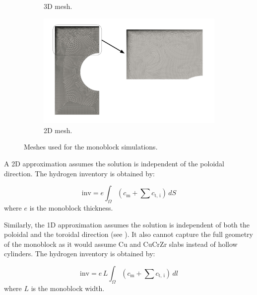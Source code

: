 \begin{figure}
\begin{subfigure}{0.27\linewidth}
        \caption{3D mesh.}
    \end{subfigure}%
    \begin{subfigure}{0.73\linewidth}
        \includegraphics[width=\linewidth]{Figures/Chapter3/monoblocks/mesh_2d.pdf}
        \caption{2D mesh.}
    \end{subfigure}
    \caption{Meshes used for the monoblock simulations.}
\end{figure}

A 2D approximation assumes the solution is independent of the poloidal direction.
The hydrogen inventory is obtained by:

\begin{equation}
    \mathrm{inv} = e \int_\Omega (c_\mathrm{m} + \sum c_\mathrm{t,\, i}) \, dS
\end{equation}
where $e$ is the monoblock thickness.

Similarly, the 1D approximation assumes the solution is independent of both the poloidal and the toroidal direction (see ).
It also cannot capture the full geometry of the monoblock as it would assume Cu and CuCrZr slabs instead of hollow cylinders.
The hydrogen inventory is obtained by:

\begin{equation}
    \mathrm{inv} = e \, L \int_\Omega (c_\mathrm{m} + \sum c_\mathrm{t,\, i}) \, dl
\end{equation}
where $L$ is the monoblock width.

